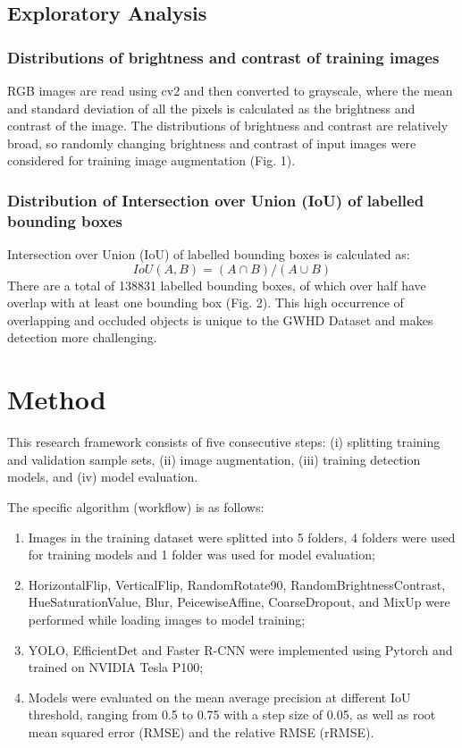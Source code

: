 \documentclass[utf8]{frontiersSCNS} %
\begin{document}
\subsection{Exploratory Analysis}
\subsubsection{Distributions of brightness and contrast of training images}
RGB images are read using cv2 and then converted to grayscale, where the mean and standard deviation of all the pixels is calculated as the brightness and contrast of the image. The distributions of brightness and contrast are relatively broad, so randomly changing brightness and contrast of input images were considered for training image augmentation (Fig. 1).

\subsubsection{Distribution of Intersection over Union (IoU) of labelled bounding boxes}
Intersection over Union (IoU) of labelled bounding boxes is calculated as:
\begin{equation}
IoU(A,B) = (A\cap B)/(A\cup B)\label{eq:01}
\end{equation}
There are a total of 138831 labelled bounding boxes, of which over half have overlap with at least one bounding box (Fig. 2). This high occurrence of overlapping and occluded objects is unique to the GWHD Dataset and makes detection more challenging.


\section{Method}
This research framework consists of five consecutive steps: (i) splitting training and validation sample sets, (ii) image augmentation, (iii) training detection models, and (iv) model evaluation.

The specific algorithm (workflow) is as follows:

\begin{enumerate}[labelwidth=1.5cm,labelindent=10pt,leftmargin=2.2cm,label=\bfseries Step \arabic*.,align=left]
  \item Images in the training dataset were splitted into 5 folders, 4 folders were used for training models and 1 folder was used for model evaluation;
  \item HorizontalFlip, VerticalFlip, RandomRotate90, RandomBrightnessContrast, HueSaturationValue, Blur, PeicewiseAffine, CoarseDropout, and MixUp were performed while loading images to model training;
  \item YOLO, EfficientDet and Faster R-CNN were implemented using Pytorch and trained on NVIDIA Tesla P100;
  \item Models were evaluated on the mean average precision at different IoU threshold, ranging from 0.5 to 0.75 with a step size of 0.05, as well as root mean squared error (RMSE) and the relative RMSE (rRMSE).
\end{enumerate}
\end{document}
